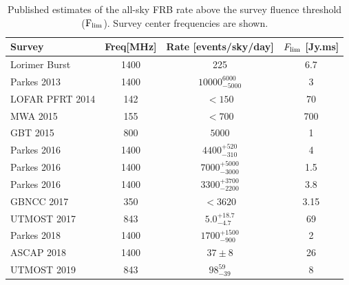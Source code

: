 \documentclass[fleqn,usenatbib]{mnras}
\begin{document}
\begin{table}[t]
\caption{Published estimates of the all-sky FRB rate above the survey fluence threshold ($\rm{F_{lim}}$). Survey center frequencies are shown.}
\label{published rates}
{\renewcommand{\arraystretch}{1.5}%
\begin{tabular}{lccc}
\hline
Survey                              & Freq[MHz]  & Rate [events/sky/day]       & $F_{\rm{lim}}$ [Jy.ms]                                                  \\ \hline
 Lorimer Burst \citep{Lorimer}  & 1400             & 225                       & 6.7                       \\
 Parkes 2013 \citep{parkes2013}     & 1400             & $10000^{6000}_{-5000}$    & 3                         \\
 LOFAR PFRT 2014 \citep{lofar2014}& 142              & $< 150$                    & 70    \\
 MWA 2015  \citep{mwa2015}      & 155              & $< 700$                      &  700                  	\\
 GBT 2015  \citep{gbt2015}      & 800              & $5000$                    & 1                         \\
 Parkes 2016 \citep{parkes20160} & 1400             & $4400^{+520}_{-310}$       & 4                         \\
 Parkes 2016 \citep{parkes20161}     & 1400             & $7000^{+5000}_{-3000}$    & 1.5                       \\
 Parkes 2016   \citep{parkes20162}  & 1400             & $3300^{+3700}_{-2200} $    & 3.8                       \\    
 GBNCC 2017 \citep{gbncc2017}   & 350               & $ < 3620$  & 3.15                                         \\
 UTMOST 2017  \citep{utmost2017}   & 843              & $5.0^{+18.7}_{-4.7}$     & 69                        \\
 Parkes 2018  \citep{parkes2018}  & 1400             & $1700^{+1500}_{-900}$      & 2                         \\ 
 ASCAP 2018    \citep{ascap2018}  & 1400             & $37 \pm 8 $               & 26                    	\\
 UTMOST 2019   \citep{utmost2019}  & 843              & $98^{59}_{-39}$           & 8                         \\    
 \hline
\end{tabular}}
\end{table}
\end{document}
